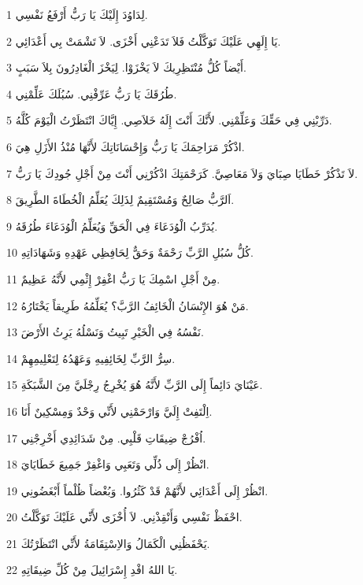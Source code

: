 \par 1 لِدَاوُدَ إِلَيْكَ يَا رَبُّ أَرْفَعُ نَفْسِي.
\par 2 يَا إِلَهِي عَلَيْكَ تَوَكَّلْتُ فَلاَ تَدَعْنِي أَخْزَى. لاَ تَشْمَتْ بِي أَعْدَائِي.
\par 3 أَيْضاً كُلُّ مُنْتَظِرِيكَ لاَ يَخْزَوْا. لِيَخْزَ الْغَادِرُونَ بِلاَ سَبَبٍ.
\par 4 طُرُقَكَ يَا رَبُّ عَرِّفْنِي. سُبُلَكَ عَلِّمْنِي.
\par 5 دَرِّبْنِي فِي حَقِّكَ وَعَلِّمْنِي. لأَنَّكَ أَنْتَ إِلَهُ خَلاَصِي. إِيَّاكَ انْتَظَرْتُ الْيَوْمَ كُلَّهُ.
\par 6 اذْكُرْ مَرَاحِمَكَ يَا رَبُّ وَإِحْسَانَاتِكَ لأَنَّهَا مُنْذُ الأَزَلِ هِيَ.
\par 7 لاَ تَذْكُرْ خَطَايَا صِبَايَ وَلاَ مَعَاصِيَّ. كَرَحْمَتِكَ اذْكُرْنِي أَنْتَ مِنْ أَجْلِ جُودِكَ يَا رَبُّ.
\par 8 اَلرَّبُّ صَالِحٌ وَمُسْتَقِيمٌ لِذَلِكَ يُعَلِّمُ الْخُطَاةَ الطَّرِيقَ.
\par 9 يُدَرِّبُ الْوُدَعَاءَ فِي الْحَقِّ وَيُعَلِّمُ الْوُدَعَاءَ طُرُقَهُ.
\par 10 كُلُّ سُبُلِ الرَّبِّ رَحْمَةٌ وَحَقٌّ لِحَافِظِي عَهْدِهِ وَشَهَادَاتِهِ.
\par 11 مِنْ أَجْلِ اسْمِكَ يَا رَبُّ اغْفِرْ إِثْمِي لأَنَّهُ عَظِيمٌ.
\par 12 مَنْ هُوَ الإِنْسَانُ الْخَائِفُ الرَّبَّ؟ يُعَلِّمُهُ طَرِيقاً يَخْتَارُهُ.
\par 13 نَفْسُهُ فِي الْخَيْرِ تَبِيتُ وَنَسْلُهُ يَرِثُ الأَرْضَ.
\par 14 سِرُّ الرَّبِّ لِخَائِفِيهِ وَعَهْدُهُ لِتَعْلِيمِهِمْ.
\par 15 عَيْنَايَ دَائِماً إِلَى الرَّبِّ لأَنَّهُ هُوَ يُخْرِجُ رِجْلَيَّ مِنَ الشَّبَكَةِ.
\par 16 اِلْتَفِتْ إِلَيَّ وَارْحَمْنِي لأَنِّي وَحْدٌ وَمِسْكِينٌ أَنَا.
\par 17 اُفْرُجْ ضِيقَاتِ قَلْبِي. مِنْ شَدَائِدِي أَخْرِجْنِي.
\par 18 انْظُرْ إِلَى ذُلِّي وَتَعَبِي وَاغْفِرْ جَمِيعَ خَطَايَايَ.
\par 19 انْظُرْ إِلَى أَعْدَائِي لأَنَّهُمْ قَدْ كَثُرُوا. وَبُغْضاً ظُلْماً أَبْغَضُونِي.
\par 20 احْفَظْ نَفْسِي وَأَنْقِذْنِي. لاَ أُخْزَى لأَنِّي عَلَيْكَ تَوَكَّلْتُ.
\par 21 يَحْفَظُنِي الْكَمَالُ وَالاِسْتِقَامَةُ لأَنِّي انْتَظَرْتُكَ.
\par 22 يَا اللهُ افْدِ إِسْرَائِيلَ مِنْ كُلِّ ضِيقَاتِهِ.

